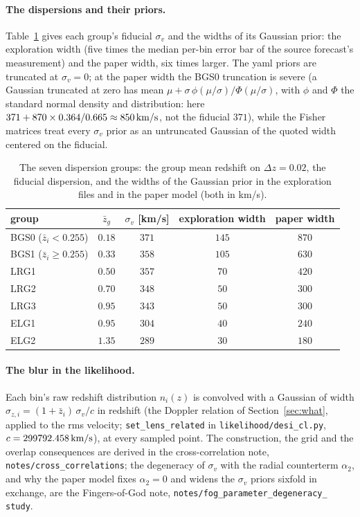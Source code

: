 \documentclass[11pt]{article}
\newcommand{\sv}{\sigma_v}
\newcommand{\kms}{\,{\rm km/s}}
\newcommand{\us}{\_\allowbreak}
\begin{document}
\paragraph{The dispersions and their priors.}
Table~\ref{tab:sigv} gives each group's fiducial $\sv$ and the widths
of its Gaussian prior: the exploration width (five times the median
per-bin error bar of the source forecast's measurement) and the paper
width, six times larger.  The yaml priors are truncated at $\sv = 0$;
at the paper width the BGS0 truncation is severe (a Gaussian truncated
at zero has mean $\mu + \sigma\,\phi(\mu/\sigma)/\Phi(\mu/\sigma)$,
with $\phi$ and $\Phi$ the standard normal density and distribution:
here $371 + 870 \times 0.364/0.665 \approx 850\kms$, not the fiducial
$371$), while the Fisher
matrices treat every $\sv$ prior as an untruncated Gaussian of the
quoted width centered on the fiducial.

\begin{table}[tbp]
  \centering
  \begin{tabular}{lcccc}
    \hline
    group & $\bar{z}_g$ & $\sv$ [km/s] & exploration width & paper width \\
    \hline
    BGS0 ($\bar{z}_i < 0.255$) & $0.18$ & $371$ & $145$ & $870$ \\
    BGS1 ($\bar{z}_i \ge 0.255$) & $0.33$ & $358$ & $105$ & $630$ \\
    LRG1 & $0.50$ & $357$ & $70$ & $420$ \\
    LRG2 & $0.70$ & $348$ & $50$ & $300$ \\
    LRG3 & $0.95$ & $343$ & $50$ & $300$ \\
    ELG1 & $0.95$ & $304$ & $40$ & $240$ \\
    ELG2 & $1.35$ & $289$ & $30$ & $180$ \\
    \hline
  \end{tabular}
  \caption{The seven dispersion groups: the group mean redshift on
    $\Delta z = 0.02$, the fiducial dispersion, and the widths of the
    Gaussian prior in the exploration files and in the paper model
    (both in km/s).}
  \label{tab:sigv}
\end{table}

\paragraph{The blur in the likelihood.}
Each bin's raw redshift distribution $n_i(z)$ is convolved with a
Gaussian of width $\sigma_{z,i} = (1 + \bar{z}_i)\,\sv/c$ in redshift
(the Doppler relation of Section~\ref{sec:what}, applied to the rms
velocity; \texttt{set\us lens\us related} in
\texttt{likelihood/desi\us cl.py}, $c = 299792.458\kms$), at every
sampled point.  The construction, the
grid and the overlap consequences are derived in the cross-correlation
note, \texttt{notes/cross\us correlations}; the degeneracy of $\sv$
with the radial counterterm $\alpha_2$, and why the paper model fixes
$\alpha_2 = 0$ and widens the $\sv$ priors sixfold in exchange, are the
Fingers-of-God note, \texttt{notes/fog\us parameter\us degeneracy\us
study}.
\end{document}
